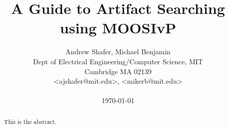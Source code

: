 \documentclass[conference]{IEEEtran}
\begin{document}
\newlength{\pin}
\setlength{\pin}{0.2in}
\newcommand{\email}[1]{\textless #1\textgreater}

\newenvironment{hangpar}[1]{\list{}{
    \setlength{\listparindent}{1.5em}       \setlength{\itemindent}{0pt}
    \setlength{\itemsep}{0pt}               \setlength{\parindent}{0pt}
    \setlength{\rightmargin}{0pt}           \setlength{\leftmargin}{#1}
               \parsep                                 \medskipamount}%
    \item\hspace{-\leftmargin}\noindent\ignorespaces}
    {\endlist}


\title{A Guide to Artifact Searching using MOOSIvP}


\author{Andrew Shafer, Michael Benjamin \\
Dept of Electrical Engineering/Computer Science, MIT \\
Cambridge MA 02139 \\
\email{ajshafer@mit.edu}, \email{mikerb@mit.edu} \\ \\
{\Large{\today}}}
\maketitle



\begin{abstract}
This is the abstract.
\end{abstract}











\small
 


\newpage
\appendix

%
%
\end{document}
